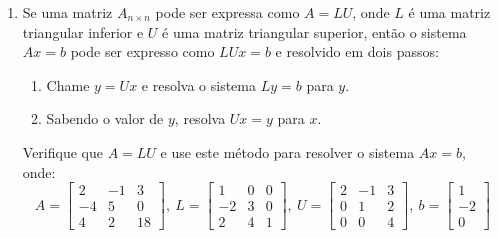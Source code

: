 \documentclass[a4paper,5pt]{amsbook}
\begin{document}
\begin{enumerate}
	\vspace{0.5cm}
	\item Se uma matriz $A_{n\times{}n}$ pode ser expressa como $A=LU$, onde $L$
		\'e uma matriz triangular inferior e $U$ \'e uma matriz triangular
		superior, ent\~ao o sistema $Ax=b$ pode ser expresso como $LUx=b$ e
		resolvido em dois passos:
		\begin{enumerate}
			\item Chame $y = Ux$ e resolva o sistema $Ly=b$ para $y$.
			\item Sabendo o valor de $y$, resolva $Ux=y$ para $x$.
		\end{enumerate}
		Verifique que $A=LU$ e use este m\'etodo para resolver o sistema $Ax=b$, onde:
		\[A = \begin{bmatrix}
				2 & -1 & 3 \\
				-4 & 5 & 0 \\
				4 & 2 & 18
			\end{bmatrix},\ 
		L = \begin{bmatrix}
				1 & 0 & 0 \\
				-2 & 3 & 0 \\
				2 & 4 & 1
			\end{bmatrix},\ 
		U = \begin{bmatrix}
				2 & -1 & 3 \\
				0 & 1 & 2 \\
				0 & 0 & 4
			\end{bmatrix},\ 
		b = \begin{bmatrix}
			1 \\ -2 \\ 0
		\end{bmatrix}\]
\end{enumerate}
\end{document}
